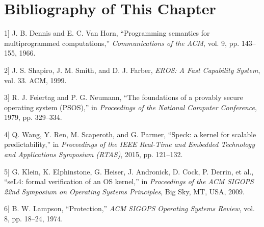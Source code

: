 \section{Bibliography of This Chapter}\label{sec:2-chapter-bibliography}

\protect{}\label{cite:2-1}

\noindent {[}1{]} J. B. Dennis and E. C. Van Horn, ``Programming semantics for multiprogrammed computations,'' \textit{Communications of the ACM}, vol. 9, pp. 143--155, 1966.

\protect{}\label{cite:2-2}

\noindent {[}2{]} J. S. Shapiro, J. M. Smith, and D. J. Farber, \textit{EROS: A Fast Capability System}, vol. 33. ACM, 1999.

\protect{}\label{cite:2-3}

\noindent {[}3{]} R. J. Feiertag and P. G. Neumann, ``The foundations of a provably secure operating system (PSOS),'' in \textit{Proceedings of the National Computer Conference}, 1979, pp. 329--334.

\protect{}\label{cite:2-4}

\noindent {[}4{]} Q. Wang, Y. Ren, M. Scaperoth, and G. Parmer, ``Speck: a kernel for scalable predictability,'' in \textit{Proceedings of the IEEE Real-Time and Embedded Technology and Applications Symposium (RTAS)}, 2015, pp. 121--132.

\protect{}\label{cite:2-5}

\noindent {[}5{]} G. Klein, K. Elphinstone, G. Heiser, J. Andronick, D. Cock, P. Derrin, et al., ``seL4: formal verification of an OS kernel,'' in \textit{Proceedings of the ACM SIGOPS 22nd Symposium on Operating Systems Principles}, Big Sky, MT, USA, 2009.

\protect{}\label{cite:2-6}

\noindent {[}6{]} B. W. Lampson, ``Protection,'' \textit{ACM SIGOPS Operating Systems Review}, vol. 8, pp. 18--24, 1974.

